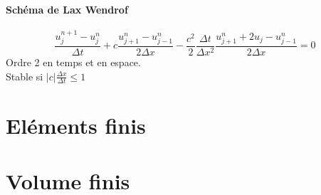 \documentclass[12pt]{report}
\begin{document}
\subsubsection{Sch\'ema de Lax Wendrof}
$$\frac{u_j^{n+1}- u_j^n}{\Delta t} +
c \frac{u_{j+1}^n- u_{j-1}^n}{2 \Delta x}-
\frac{c^2}{2}\frac{\Delta t}{\Delta x^2} 
\frac{u_{j+1}^n+2 u_j- u_{j-1}^n}{2 \Delta x}=0$$
Ordre 2 en temps et en espace.\\
Stable si $|c| \frac{\Delta x}{\Delta t} \le 1$

\chapter{El\'ements finis}
\section{}

\chapter{Volume finis}
\section{}
\end{document}
